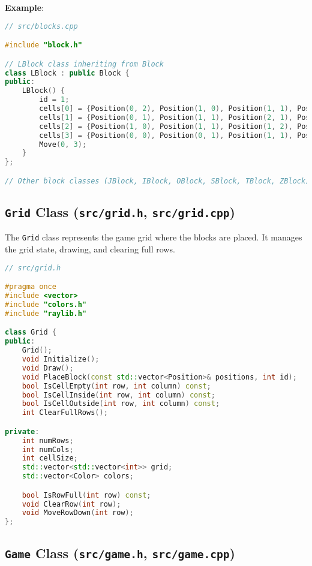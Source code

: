 \documentclass{article}
\begin{document}
\textbf{Example}:

\begin{lstlisting}[language=C++]
// src/blocks.cpp

#include "block.h"

// LBlock class inheriting from Block
class LBlock : public Block {
public:
    LBlock() {
        id = 1;
        cells[0] = {Position(0, 2), Position(1, 0), Position(1, 1), Position(1, 2)};
        cells[1] = {Position(0, 1), Position(1, 1), Position(2, 1), Position(2, 2)};
        cells[2] = {Position(1, 0), Position(1, 1), Position(1, 2), Position(2, 0)};
        cells[3] = {Position(0, 0), Position(0, 1), Position(1, 1), Position(2, 1)};
        Move(0, 3);
    }
};

// Other block classes (JBlock, IBlock, OBlock, SBlock, TBlock, ZBlock) defined similarly
\end{lstlisting}

\subsection{\texttt{Grid} Class (\texttt{src/grid.h}, \texttt{src/grid.cpp})}

The \texttt{Grid} class represents the game grid where the blocks are placed. It manages the grid state, drawing, and clearing full rows.

\begin{lstlisting}[language=C++]
// src/grid.h

#pragma once
#include <vector>
#include "colors.h"
#include "raylib.h"

class Grid {
public:
    Grid();
    void Initialize();
    void Draw();
    void PlaceBlock(const std::vector<Position>& positions, int id);
    bool IsCellEmpty(int row, int column) const;
    bool IsCellInside(int row, int column) const;
    bool IsCellOutside(int row, int column) const;
    int ClearFullRows();

private:
    int numRows;
    int numCols;
    int cellSize;
    std::vector<std::vector<int>> grid;
    std::vector<Color> colors;

    bool IsRowFull(int row) const;
    void ClearRow(int row);
    void MoveRowDown(int row);
};
\end{lstlisting}

\subsection{\texttt{Game} Class (\texttt{src/game.h}, \texttt{src/game.cpp})}
\end{document}
